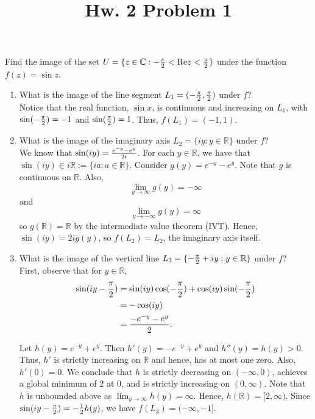 \documentclass[12pt]{article}
\newcommand{\C}{\mathbb{C}}
\newcommand{\R}{\mathbb{R}}
\renewcommand{\Re}{\text{Re}}
\begin{document}
\title{Hw. 2 Problem 1}
\maketitle

Find the image of the set $U=\{z\in \C:-{\pi\over 2}<\Re z<{\pi\over 2}\}$ under the function $f(z)=\sin⁡ z$.

\begin{enumerate}
\item What is the image of the line segment $L_1=(-{\pi\over2},{\pi\over 2})$ under $f$?\\

Notice that the real function, $\sin x$, is continuous and increasing on $L_1$, with $\sin (-{\pi\over 2}) = -1$ and $\sin ({\pi\over 2}) = 1$. Thus, $f(L_1)=(-1,1)$.

\item What is the image of the imaginary axis $L_2=\{iy:y\in\R\}$ under $f$?\\

We know that $\sin (iy)= {e^{-y}-e^y \over 2i}$. For each $y\in\R$, we have that $\sin (iy)\in i\R:=\{ia:a\in\R\}$. Consider $g(y) = e^{-y}-e^y$. Note that $g$ is continuous on $\R$. Also,
$$\lim_{y\to\infty}g(y)=-\infty$$ and $$\lim_{y\to-\infty}g(y)=\infty$$
so $g(\R)=\R$ by the intermediate value theorem (IVT). Hence, $\sin (iy)=2i g(y)$, so $f(L_2)=L_2$, the imaginary axis itself.

\item What is the image of the vertical line $L_3=\{-{\pi\over2}+iy:y\in\R\}$ under $f$?\\

First, observe that for $y\in\R$,
\begin{align*}
\sin (iy-{\pi\over 2}) &= \sin(iy)\cos(-{\pi\over2})+\cos(iy)\sin (-{\pi\over 2})\\
&=-\cos(iy)\\
&={-e^{-y}-e^y\over 2}.
\end{align*}

Let $h(y)= e^{-y}+e^{y}$. Then $h'(y)= -e^{-y}+e^y$ and $h''(y)=h(y)>0$. Thus, $h'$ is strictly increasing on $\R$ and hence, has at most one zero. Also, $h'(0)=0$. We conclude that $h$ is strictly decreasing on $(-\infty,0)$, achieves a global minimum of $2$ at $0$, and is strictly increasing on $(0,\infty)$. Note that $h$ is unbounded above as $\lim_{y\to\infty}h(y)=\infty$. Hence, $h(\R)=[2,\infty)$. Since $\sin(iy-{\pi\over2})=-{1\over 2}h(y)$, we have $f(L_3)=(-\infty,-1]$.


\end{enumerate}
\end{document}
